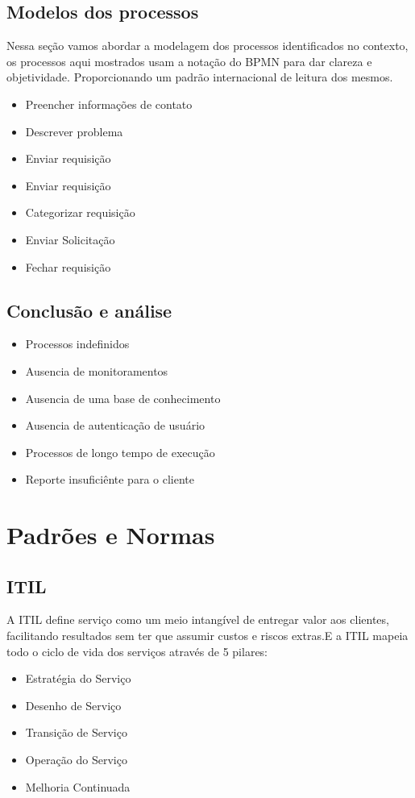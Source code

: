 \documentclass[11pt,a4paper]{article}
\begin{document}
\subsection{Modelos dos processos}
Nessa seção vamos abordar a modelagem dos processos identificados no contexto,
os processos aqui mostrados usam a notação do BPMN para dar clareza e objetividade.
Proporcionando um padrão internacional de leitura dos mesmos.




\begin{itemize}[noitemsep]
	\item Preencher informações de contato
	\item Descrever problema
	\item Enviar requisição
	\item Enviar requisição
	\item Categorizar requisição
	\item Enviar Solicitação
	\item Fechar requisição
\end{itemize}








\subsection{Conclusão e análise}
\begin{itemize}[noitemsep]
  \item Processos indefinidos
  \item Ausencia de monitoramentos
  \item Ausencia de uma base de conhecimento
  \item Ausencia de autenticação de usuário
  \item Processos de longo tempo de execução
  \item Reporte insuficiênte para o cliente
\end{itemize}

\section{Padrões e Normas}
\subsection{ITIL}

A ITIL define serviço como um meio intangível de entregar valor aos clientes,
facilitando resultados sem ter que assumir custos e riscos extras.E a ITIL mapeia
todo o ciclo de vida dos serviços através de 5 pilares:
\begin{itemize}[noitemsep]
  \item Estratégia do Serviço
  \item Desenho de Serviço
  \item Transição de Serviço
  \item Operação do Serviço
  \item Melhoria Continuada
\end{itemize}
\end{document}
